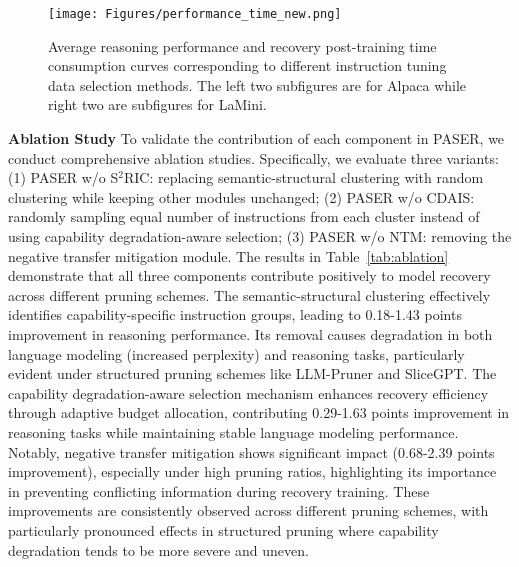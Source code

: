 \begin{figure*}[h]
    \centering
    \texttt{[image: Figures/performance\_time\_new.png]}
    \caption{Average reasoning performance and recovery post-training time consumption curves corresponding to different instruction tuning data selection methods. The left two subfigures are for Alpaca while right two are subfigures for LaMini.}
   \label{fig: efficiency}
\vspace{-2mm}
\end{figure*}

\textbf{Ablation Study}
To validate the contribution of each component in PASER, we conduct comprehensive ablation studies. Specifically, we evaluate three variants: (1) PASER w/o S$^2$RIC: replacing semantic-structural clustering with random clustering while keeping other modules unchanged; (2) PASER w/o CDAIS: randomly sampling equal number of instructions from each cluster instead of using capability degradation-aware selection; (3) PASER w/o NTM: removing the negative transfer mitigation module. 
The results in Table~\ref{tab:ablation} demonstrate that all three components contribute positively to model recovery across different pruning schemes. The semantic-structural clustering effectively identifies capability-specific instruction groups, leading to 0.18-1.43 points improvement in reasoning performance. Its removal causes degradation in both language modeling (increased perplexity) and reasoning tasks, particularly evident under structured pruning schemes like LLM-Pruner and SliceGPT. The capability degradation-aware selection mechanism enhances recovery efficiency through adaptive budget allocation, contributing 0.29-1.63 points improvement in reasoning tasks while maintaining stable language modeling performance. Notably, negative transfer mitigation shows significant impact (0.68-2.39 points improvement), especially under high pruning ratios, highlighting its importance in preventing conflicting information during recovery training. These improvements are consistently observed across different pruning schemes, with particularly pronounced effects in structured pruning where capability degradation tends to be more severe and uneven.



